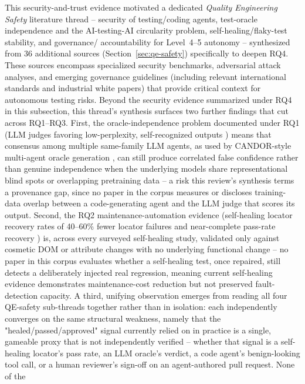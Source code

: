 This security-and-trust evidence motivated a dedicated \emph{Quality
Engineering Safety} literature thread -- security of testing/coding
agents, test-oracle independence and the AI-testing-AI circularity
problem, self-healing/flaky-test stability, and governance/
accountability for Level~4--5 autonomy -- synthesized from 36
additional sources (Section~\ref{sec:qe-safety}) specifically to
deepen RQ4. These sources encompass specialized security benchmarks,
adversarial attack analyses, and emerging governance guidelines
(including relevant international standards and industrial white papers)
that provide critical context for autonomous testing risks.
Beyond the security evidence summarized under RQ4 in this subsection,
this thread's synthesis surfaces two further findings that cut across RQ1--RQ3.
First, the oracle-independence
problem documented under RQ1 (LLM judges favoring low-perplexity,
self-recognized outputs \cite{wataoka2024selfpreference,panickssery2024evaluators})
means that consensus among multiple same-family LLM agents, as used
by CANDOR-style multi-agent oracle generation \cite{xu2025candor}, can
still produce correlated false confidence rather than genuine
independence when the underlying models share representational blind
spots or overlapping pretraining data -- a risk this review's
synthesis terms a provenance gap, since no paper in the corpus
measures or discloses training-data overlap between a code-generating
agent and the LLM judge that scores its output. Second, the RQ2
maintenance-automation evidence (self-healing locator recovery rates
of 40--60\% fewer locator failures and near-complete pass-rate
recovery \cite{joseph2026zerocost,rohamo2024robotframework,ijam2025healenium})
is, across every surveyed self-healing study, validated only against
cosmetic DOM or attribute changes with no underlying functional
change -- no paper in this corpus evaluates whether a self-healing
test, once repaired, still detects a deliberately injected real
regression, meaning current self-healing evidence demonstrates
maintenance-cost reduction but not preserved fault-detection capacity.
A third, unifying observation emerges from reading all four QE-safety
sub-threads together rather than in isolation: each independently
converges on the same structural weakness, namely that the
"healed/passed/approved" signal currently relied on in practice is a
single, gameable proxy that is not independently verified -- whether
that signal is a self-healing locator's pass rate, an LLM oracle's
verdict, a code agent's benign-looking tool call, or a human
reviewer's sign-off on an agent-authored pull request. None of the

